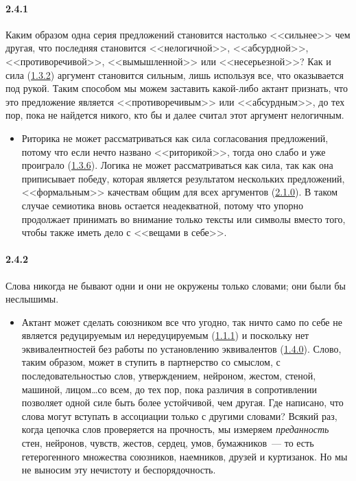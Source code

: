 \paragraph{2.4.1}\hypertarget{par:2.4.1}{} Каким образом одна серия предложений становится настолько <<сильнее>> чем другая, что последняя становится <<нелогичной>>, <<абсурдной>>, <<противоречивой>>, <<вымышленной>> или <<несерьезной>>? Как и сила (\hyperlink{par:1.3.2}{1.3.2}) аргумент становится сильным, лишь используя все, что оказывается под рукой. Таким способом мы можем заставить какой-либо актант признать, что это предложение является <<противоречивым>> или <<абсурдным>>, до тех пор, пока не найдется никого, кто бы и далее считал этот аргумент нелогичным.
	\begin{itemize}
	\item 
	Риторика не может рассматриваться как сила согласования предложений, потому что если нечто названо <<риторикой>>, тогда оно слабо и уже проиграло (\hyperlink{par:1.3.6}{1.3.6}). Логика не может рассматриваться как сила, так как она приписывает победу, которая является результатом нескольких предложений, <<формальным>> качествам общим для всех аргументов (\hyperlink{par:2.1.0}{2.1.0}). В таком случае семиотика вновь остается неадекватной, потому что упорно продолжает принимать во внимание только тексты или символы вместо того, чтобы также иметь дело с <<вещами в себе>>.
	\end{itemize}

\paragraph{2.4.2}\hypertarget{par:2.4.2}{} Слова никогда не бывают одни и они не окружены только словами; они были бы неслышимы.
	\begin{itemize}
	\item 
	Актант может сделать союзником все что угодно, так ничто само по себе не является редуцируемым ил нередуцируемым (\hyperlink{par:1.1.1}{1.1.1}) и поскольку нет эквивалентностей без работы по установлению эквивалентов (\hyperlink{par:1.4.0}{1.4.0}). Слово, таким образом, может в ступить в партнерство со смыслом, с последовательностью слов, утверждением, нейроном, жестом, стеной, машиной, лицом\ldots со всем, до тех пор, пока различия в сопротивлении позволяет одной силе быть более устойчивой, чем другая. Где написано, что слова могут вступать в ассоциации только с другими словами? Всякий раз, когда цепочка слов проверяется на прочность, мы измеряем {\itshape преданность} стен, нейронов, чувств, жестов, сердец, умов, бумажников~--- то есть гетерогенного множества союзников, наемников, друзей и куртизанок. Но мы не выносим эту нечистоту и беспорядочность.
	\end{itemize}

